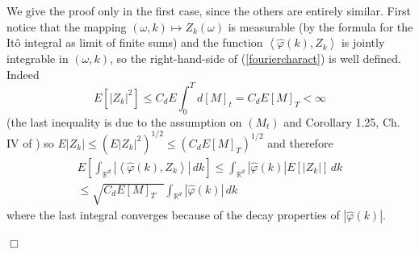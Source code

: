 \documentclass{article}
\newenvironment{proof}[1][Proof]{{\sc #1.} }{\hfill $\Box$}
\begin{document}
\begin{proof}
We give the proof only in the first case, since the others are entirely
similar. First notice that the mapping $(\omega ,k)\mapsto Z_{k}\left(
\omega \right) $ is measurable (by the formula for the It\^{o} integral as
limit of finite sums) and the function $\left\langle \hat{\varphi}\left(
k\right) ,Z_{k}\right\rangle $ is jointly integrable in $(\omega ,k)$, so
the right-hand-side of (\ref{fouriercharact}) is well defined. Indeed 
\begin{equation}
E[ \left| Z_{k}\right| ^{2}] \leq C_{d}E\int_{0}^{T}d\left[ M%
\right] _{t}=C_{d}E\left[ M\right] _{T}<\infty  \label{easybound}
\end{equation}
(the last inequality is due to the assumption on $\left( M_{t}\right) $ and
Corollary 1.25, Ch. IV of \cite{RY}) so $E \left| Z_{k}\right| 
\leq (E\left| Z_{k}\right| ^{2})^{1/2}\leq (C_{d}E\left[ M%
\right] _{T})^{1/2}$ and therefore 
\begin{eqnarray*}
E\left[ \int_{\mathbb{R}^{d}}\left| \left\langle \hat{\varphi}\left(
k\right) ,Z_{k}\right\rangle \right| \,dk\right] \leq \int_{\mathbb{R}%
^{d}}\left| \hat{\varphi}\left( k\right) \right| E [\left| Z_{k}\right| ]%
 \,dk \\
\leq \sqrt{C_{d}E\left[ M\right] _{T}\text{ }}\int_{\mathbb{R}^{d}}\left| 
\hat{\varphi}\left( k\right) \right| \,dk
\end{eqnarray*}
where the last integral converges because of the decay properties of $\left| 
\hat{\varphi}\left( k\right) \right| $.


\end{proof}
\end{document}

